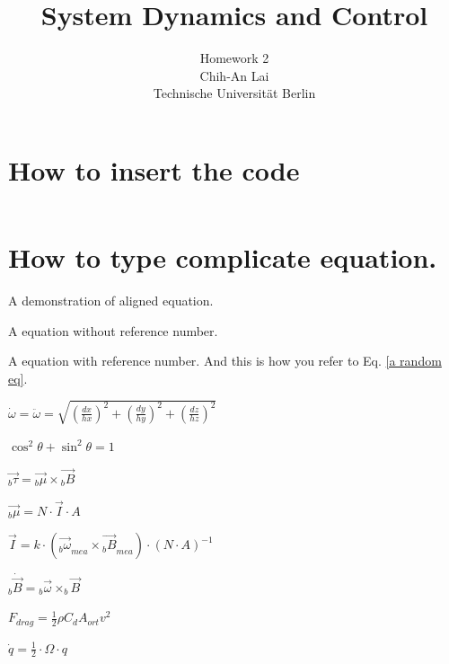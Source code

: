 \documentclass{mytemplate}
\title{System Dynamics and Control} %
\author{Homework 2\\ %
Chih-An Lai\\ %
Technische Universität Berlin %
}
\begin{document}
\maketitle

\tableofcontents

\section{How to insert the code}
\inputminted[fontsize=\footnotesize,frame=single,label=least\_cost\_function.m]{octave}{least_cost_function.m}

 \section{How to type complicate equation.}
A demonstration of aligned equation.

A equation without reference number.

A equation with reference number.
\label{a random eq}
And this is how you refer to Eq. \ref{a random eq}.

$\dot{\omega} = \ddot{\omega} = \sqrt{ \left( \frac{dx}{hx} \right)^{\!\!2} +  \left( \frac{dy}{hy} \right)^{\!\!2} +  \left( \frac{dz}{hz} \right)^{\!\!2}}$

$\cos^2 \theta + \sin^2 \theta = 1$

$\overrightarrow{_{b}\tau} = \overrightarrow{_{b}\mu} \times \overrightarrow{_{b}B}$


$\overrightarrow{_{b}\mu} = N \cdot \overrightarrow{I} \cdot A$

$\overrightarrow{I} = {k \cdot ( \overrightarrow{_{b}\omega}_{mea} \times \overrightarrow{_{b}B}_{mea})} \cdot (N \cdot A)^{-1}$

$_{b}\dot{\overrightarrow{B}} = {_{b}\overrightarrow{\omega}} \times _{b}\overrightarrow{B}$

$F_{drag} = \frac{1}{2} \rho C_{d} A_{ort} v^2$

$\dot{q} = \frac{1}{2} \cdot \Omega \cdot q$
\end{document}
